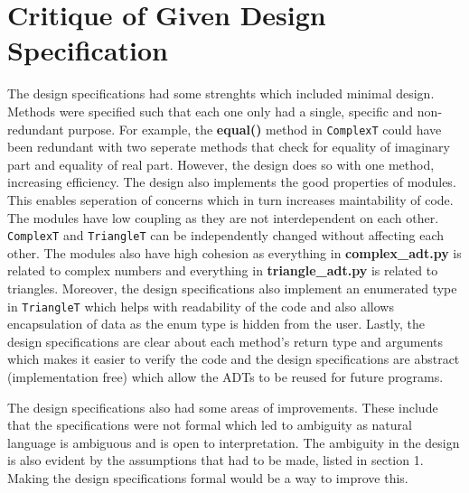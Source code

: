 \documentclass[12pt]{article}
\begin{document}
\section{Critique of Given Design Specification}
The design specifications had some strenghts which included minimal design. Methods were specified such that each one only had a single, specific and non-redundant purpose. For example, the \textbf{equal()} method in \verb|ComplexT| could have been redundant with two seperate methods that check for equality of imaginary part and equality of real part. However, the design does so with one method, increasing efficiency. 
The design also implements the good properties of modules. This enables seperation of concerns which in turn increases maintability of code. The modules have low coupling as they are not interdependent on each other. \verb|ComplexT| and \verb|TriangleT| can be independently changed without affecting each other. The modules also have high cohesion as everything in \textbf{complex\_adt.py} is related to complex numbers and everything in \textbf{triangle\_adt.py} is related to triangles.
Moreover, the design specifications also implement an enumerated type in \verb|TriangleT| which helps with readability of the code and also allows encapsulation of data as the enum type is hidden from the user. Lastly, the design specifications are clear about each method's return type and arguments which makes it easier to verify the code and the design specifications are abstract (implementation free) which allow the ADTs to be reused for future programs.
\par The design specifications also had some areas of improvements. These include that the specifications were not formal which led to ambiguity as natural language is ambiguous and is open to interpretation. The ambiguity in the design is also evident by the assumptions that had to be made, listed in section 1. Making the design specifications formal would be a way to improve this. 
\end{document}
